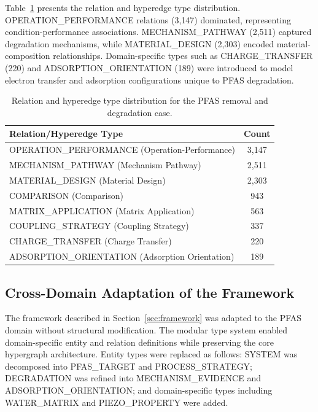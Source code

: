 \documentclass[11pt,a4paper]{article}
\begin{document}
Table~\ref{tab:pfas_relation_types} presents the relation and hyperedge type distribution. OPERATION\_PERFORMANCE relations (3,147) dominated, representing condition-performance associations. MECHANISM\_PATHWAY (2,511) captured degradation mechanisms, while MATERIAL\_DESIGN (2,303) encoded material-composition relationships. Domain-specific types such as CHARGE\_TRANSFER (220) and ADSORPTION\_ORIENTATION (189) were introduced to model electron transfer and adsorption configurations unique to PFAS degradation.

\begin{table}[htbp]
\centering
\caption{Relation and hyperedge type distribution for the PFAS removal and degradation case.}
\label{tab:pfas_relation_types}
\begin{tabular}{@{}lc@{}}
\toprule
\textbf{Relation/Hyperedge Type} & \textbf{Count} \\
\midrule
OPERATION\_PERFORMANCE (Operation-Performance) & 3,147 \\
MECHANISM\_PATHWAY (Mechanism Pathway) & 2,511 \\
MATERIAL\_DESIGN (Material Design) & 2,303 \\
COMPARISON (Comparison) & 943 \\
MATRIX\_APPLICATION (Matrix Application) & 563 \\
COUPLING\_STRATEGY (Coupling Strategy) & 337 \\
CHARGE\_TRANSFER (Charge Transfer) & 220 \\
ADSORPTION\_ORIENTATION (Adsorption Orientation) & 189 \\
\bottomrule
\end{tabular}
\end{table}

\subsection{Cross-Domain Adaptation of the Framework}

The framework described in Section~\ref{sec:framework} was adapted to the PFAS domain without structural modification. The modular type system enabled domain-specific entity and relation definitions while preserving the core hypergraph architecture. Entity types were replaced as follows: SYSTEM was decomposed into PFAS\_TARGET and PROCESS\_STRATEGY; DEGRADATION was refined into MECHANISM\_EVIDENCE and ADSORPTION\_ORIENTATION; and domain-specific types including WATER\_MATRIX and PIEZO\_PROPERTY were added.
\end{document}
